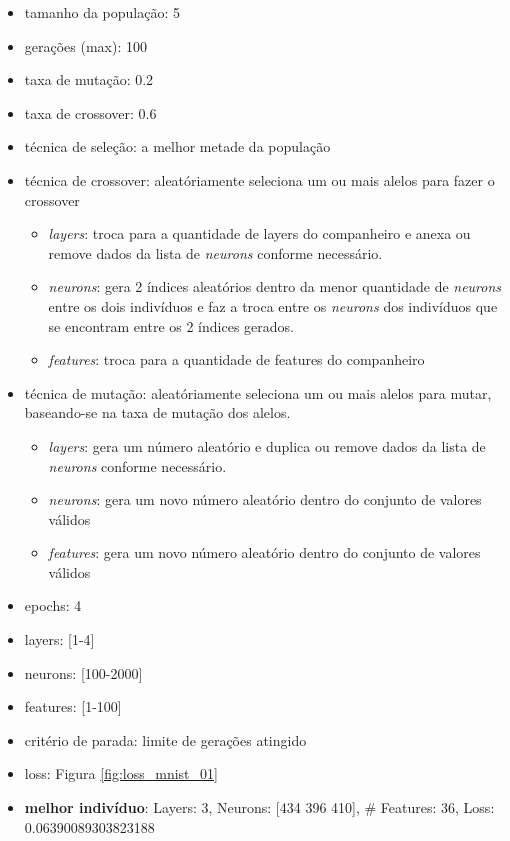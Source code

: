 \documentclass[twoside,conference,a4paper]{IEEEtran}
\begin{document}
\begin{itemize}
    \item tamanho da população: 5
    \item gerações (max): 100
    \item taxa de mutação: 0.2
    \item taxa de crossover: 0.6
    \item técnica de seleção: a melhor metade da população
    \item técnica de crossover: aleatóriamente seleciona um ou mais alelos para fazer o crossover
    \begin{itemize}
        \item \emph{layers}: troca para a quantidade de layers do companheiro e anexa ou remove dados da lista de \emph{neurons} conforme necessário.
        \item \emph{neurons}: gera 2 índices aleatórios dentro da menor quantidade de \emph{neurons} entre os dois indivíduos e faz a troca entre os \emph{neurons} dos indivíduos que se encontram entre os 2 índices gerados.
        \item \emph{features}: troca para a quantidade de features do companheiro
    \end{itemize}
    \item técnica de mutação: aleatóriamente seleciona um ou mais alelos para mutar, baseando-se na taxa de mutação dos alelos.
    \begin{itemize}
        \item \emph{layers}: gera um número aleatório e duplica ou remove dados da lista de \emph{neurons} conforme necessário.
        \item \emph{neurons}: gera um novo número aleatório dentro do conjunto de valores válidos
        \item \emph{features}: gera um novo número aleatório dentro do conjunto de valores válidos
    \end{itemize}
    \item epochs: 4
    \item layers: [1-4]
    \item neurons: [100-2000]
    \item features: [1-100]
    \item critério de parada: limite de gerações atingido
    \item loss: Figura \ref{fig:loss_mnist_01}
    \item \textbf{melhor indivíduo}: Layers: 3, Neurons: [434 396 410], \# Features: 36, Loss: 0.06390089303823188
\end{itemize}
\end{document}
